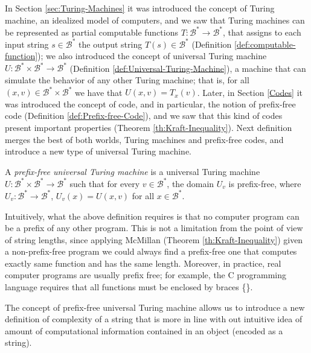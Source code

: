In Section \ref{sec:Turing-Machines} it was introduced the concept of Turing machine, an idealized model of computers, and we saw that Turing machines can be represented as partial computable functions $T:\mathcal{B}^\ast \rightarrow \mathcal{B}^\ast$, that assigns to each input string $s \in \mathcal{B}^\ast$ the output string $T(s) \in \mathcal{B}^\ast$ (Definition \ref{def:computable-function}); we also introduced the concept of universal Turing machine $U:\mathcal{B}^\ast \times \mathcal{B}^\ast \rightarrow \mathcal{B}^\ast$ (Definition \ref{def:Universal-Turing-Machine}), a machine that can simulate the behavior of any other Turing machine; that is, for all $(x,v) \in  \mathcal{B}^\ast \times \mathcal{B}^\ast$ we have that $U(x,v) = T_{x}(v)$. Later, in Section \ref{Codes} it was introduced the concept of code, and in particular, the notion of prefix-free code (Definition \ref{def:Prefix-free-Code}), and we saw that this kind of codes present important properties (Theorem \ref{th:Kraft-Inequality}). Next definition merges the best of both worlds, Turing machines and prefix-free codes, and introduce a new type of universal Turing machine.

\begin{definition}
A \emph{prefix-free universal Turing machine} is a universal Turing machine $U:\mathcal{B}^\ast \times \mathcal{B}^\ast \rightarrow \mathcal{B}^\ast$ such that for every $v \in \mathcal{B}^\ast$, the domain $U_{v}$ is prefix-free, where $U_{v}:\mathcal{B}^\ast \rightarrow \mathcal{B}^\ast$, $U_{v}(x) = U(x, v)$ for all $x \in \mathcal{B}^\ast$.
\end{definition}


Intuitively, what the above definition requires is that no computer program can be a prefix of any other program. This is not a limitation from the point of view of string lengths, since applying McMillan (Theorem \ref{th:Kraft-Inequality}) given a non-prefix-free program we could always find a prefix-free one that computes exactly same function and has the same length. Moreover, in practice, real computer programs are usually prefix free; for example, the C programming language requires that all functions must be enclosed by braces \{\}.

The concept of prefix-free universal Turing machine allows us to introduce a new definition of complexity of a string that is more in line with out intuitive idea of amount of computational information contained in an object (encoded as a string).

